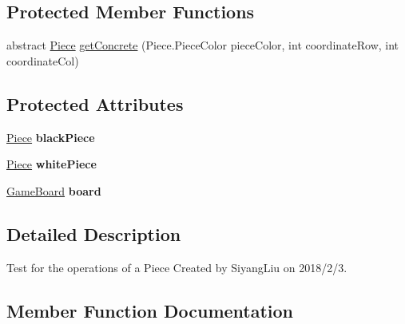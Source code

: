 \subsection*{Protected Member Functions}
\begin{DoxyCompactItemize}
\item 
abstract \mbox{\hyperlink{classpieces_1_1_piece}{Piece}} \mbox{\hyperlink{classtest_1_1_piece_test_a90a462bad11a172acd27d1b18e21ee15}{get\+Concrete}} (Piece.\+Piece\+Color piece\+Color, int coordinate\+Row, int coordinate\+Col)
\end{DoxyCompactItemize}
\subsection*{Protected Attributes}
\begin{DoxyCompactItemize}
\item 
\mbox{\label{classtest_1_1_piece_test_a567392fa471de32c6eee66f3fd6f069b}} 
\mbox{\hyperlink{classpieces_1_1_piece}{Piece}} {\bfseries black\+Piece}
\item 
\mbox{\label{classtest_1_1_piece_test_a8104ae553d8aa8bc7ec571612b1ee328}} 
\mbox{\hyperlink{classpieces_1_1_piece}{Piece}} {\bfseries white\+Piece}
\item 
\mbox{\label{classtest_1_1_piece_test_a16d1f0aea9e40fc91717bc8c74aaaa2e}} 
\mbox{\hyperlink{classgameboard_1_1_game_board}{Game\+Board}} {\bfseries board}
\end{DoxyCompactItemize}


\subsection{Detailed Description}
Test for the operations of a Piece Created by Siyang\+Liu on 2018/2/3. 

\subsection{Member Function Documentation}
\mbox{\label{classtest_1_1_piece_test_a8d83b20ef3c6fe8d2acd692b8dedb551}} 

